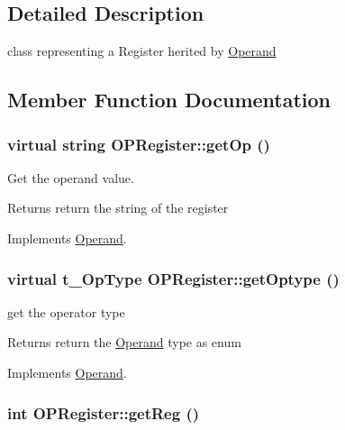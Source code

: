 \subsection{Detailed Description}
class representing a Register herited by \hyperlink{classOperand}{Operand} 

\subsection{Member Function Documentation}
\hypertarget{classOPRegister_a660f194996324eb71a3db0cbdccdab49}{
\subsubsection[{getOp}]{\setlength{\rightskip}{0pt plus 5cm}virtual string OPRegister::getOp ()}}
\label{classOPRegister_a660f194996324eb71a3db0cbdccdab49}


Get the operand value. \begin{DoxyReturn}{Returns}
return the string of the register 
\end{DoxyReturn}


Implements \hyperlink{classOperand_a8cf27955648cbf07144abf4e5a77c266}{Operand}.\hypertarget{classOPRegister_a06690941f531390e7d71526244c0812b}{
\subsubsection[{getOptype}]{\setlength{\rightskip}{0pt plus 5cm}virtual t\_\-OpType OPRegister::getOptype ()}}
\label{classOPRegister_a06690941f531390e7d71526244c0812b}


get the operator type \begin{DoxyReturn}{Returns}
return the \hyperlink{classOperand}{Operand} type as enum 
\end{DoxyReturn}


Implements \hyperlink{classOperand_af4bd7dab87bfd7f3c17ea84f07b02b69}{Operand}.\hypertarget{classOPRegister_af409289a33aff7c3d0469d748aeacd15}{
\subsubsection[{getReg}]{\setlength{\rightskip}{0pt plus 5cm}int OPRegister::getReg ()}}
\label{classOPRegister_af409289a33aff7c3d0469d748aeacd15}


